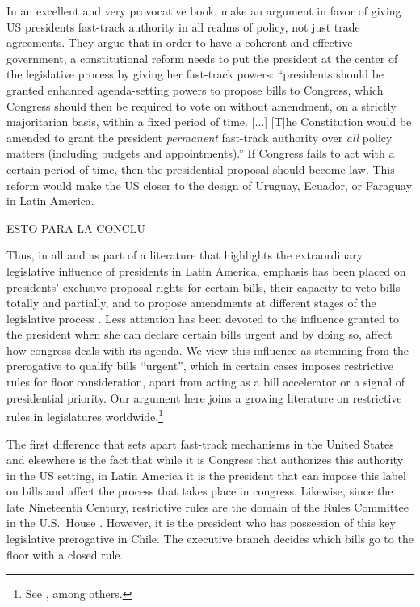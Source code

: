 \documentclass[letter,12pt]{article}
\begin{document}
In an excellent and very provocative book, \citet[][:145]{howell.moe.Relic2016} make an argument in favor of giving US presidents fast-track authority in all realms of policy, not just trade agreements. They argue that in order to have a coherent and effective government, a constitutional reform needs to put the president at the center of the legislative process by giving her fast-track powers: ``presidents should be granted enhanced agenda-setting powers to propose bills to Congress, which Congress should then be required to vote on without amendment, on a strictly majoritarian basis, within a fixed period of time. [...] [T]he Constitution would be amended to grant the president \emph{permanent} fast-track authority over \emph{all} policy matters (including budgets and appointments).'' If Congress fails to act with a certain period of time, then the presidential proposal should become law. This reform would make the US closer to the design of Uruguay, Ecuador, or Paraguay in Latin America. 





ESTO PARA LA CONCLU

Thus, in all and as part of a literature that highlights the extraordinary legislative influence of presidents in Latin America, emphasis has been placed on presidents' exclusive proposal rights for certain bills, their capacity to veto bills totally and partially, and to propose amendments at different stages of the legislative process \citep{carey.shugart.1998,baldez.carey.1999,aleman.navia.UrgChi.2009,tsebelis.aleman.2005}. Less attention has been devoted to the influence granted to the president when she can declare certain bills urgent and by doing so, affect how congress deals with its agenda. We view this influence as stemming from the prerogative to qualify bills ``urgent'', which in certain cases imposes restrictive rules for floor consideration, apart from acting as a bill accelerator or a signal of presidential priority. Our argument here joins a growing literature on restrictive rules in legislatures worldwide.\footnote{See \citet{dion.huber.1996,doring.restrictiveRules.2003,huber.1996a,krehbielRestrictiveRules1997,heller.2001,weingast.1992,schickler.richRules1997,cox.mccubbins.1997,amorim.cox.mccubbins.2003,calvo.2014argBook,sin.2014,denhartog.2004phd}, among others.} 





The first difference that sets apart fast-track mechanisms in the United States and elsewhere is the fact that while it is Congress that authorizes this authority in the US setting, in Latin America it is the president that can impose this label on bills and affect the process that takes place in congress. Likewise, since the late Nineteenth Century, restrictive rules are the domain of the Rules Committee in the U.S.\ House \citep{denhartog.2004phd,cox.mccubbins.2005,sin.2014}. However, it is the president who has possession of this key legislative prerogative in Chile. The executive branch decides which bills go to the floor with a closed rule. 
\end{document}
